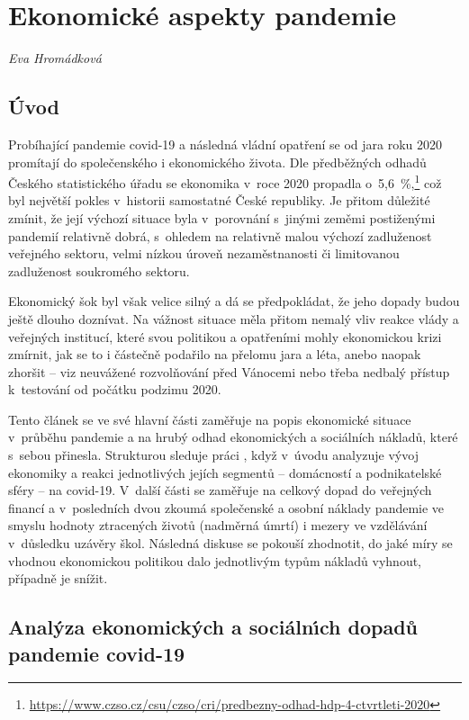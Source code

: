 
\chapter{Ekonomick\'{e} aspekty pandemie} \label{Ekonomicke_aspekty}

\textit{Eva Hromádková}
\vspace{15mm}

\section*{\'{U}vod} 
Probíhající pandemie covid-19 a následná vládní opatření se od jara roku 2020 promítají do společenského i ekonomického života. Dle předběžných odhadů Českého statistického úřadu se ekonomika v~roce 2020 propadla o~5,6~\%,\footnote{\url{https://www.czso.cz/csu/czso/cri/predbezny-odhad-hdp-4-ctvrtleti-2020}} což byl největší pokles v~historii samostatné České republiky. Je přitom důležité zmínit, že její výchozí situace byla v~porovnání s~jinými zeměmi postiženými pandemií relativně dobrá, s~ohledem na relativně malou výchozí zadluženost veřejného sektoru, velmi nízkou úroveň nezaměstnanosti či limitovanou zadluženost soukromého sektoru. 

Ekonomický šok byl však velice silný a dá se předpokládat, že jeho dopady budou ještě dlouho doznívat. Na vážnost situace měla přitom nemalý vliv reakce vlády a veřejných institucí, které svou politikou a opatřeními mohly ekonomickou krizi zmírnit, jak se to i částečně podařilo na přelomu jara a léta, anebo naopak zhoršit -- viz neuvážené rozvolňování před Vánocemi nebo třeba nedbalý přístup k~testování od počátku podzimu 2020.

Tento článek se ve své hlavní části zaměřuje na popis ekonomické situace v~prů\-bě\-hu pandemie a na hrubý odhad ekonomických a sociálních nákladů, které s~sebou přinesla. Strukturou sleduje práci \cite{Levy2021}, když v~úvodu analyzuje vývoj ekonomiky a reakci jednotlivých jejích segmentů – domácností a podnikatelské sféry – na covid-19. V~další části se zaměřuje na celkový dopad do veřejných financí a v~posledních dvou zkoumá společenské a osobní náklady pandemie ve smyslu hodnoty ztracených životů (nadměrná úmrtí) i mezery ve vzdělávání v~důsledku uzávěry škol. Následná diskuse se pokouší zhodnotit, do jaké míry se vhodnou ekonomickou politikou dalo jednotlivým typům nákladů vyhnout, případně je snížit.

\section*{Anal\'{y}za ekonomick\'{y}ch a soci\'{a}ln\'{\i}ch dopad\r{u} pandemie covid-19} 

